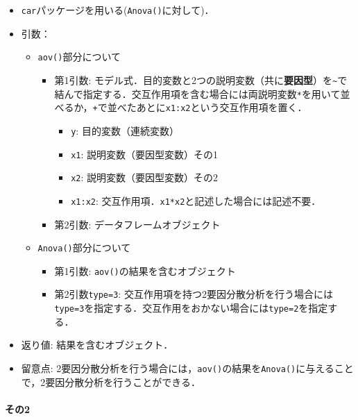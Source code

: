 \documentclass[
  xelatex, ja=standard]{bxjsarticle}
\providecommand{\tightlist}{%
  \setlength{\itemsep}{0pt}\setlength{\parskip}{0pt}}
\begin{document}
\begin{itemize}
\tightlist
\item
  \texttt{car}パッケージを用いる(\texttt{Anova()}に対して)．
\item
  引数：

  \begin{itemize}
  \tightlist
  \item
    \texttt{aov()}部分について

    \begin{itemize}
    \tightlist
    \item
      第1引数:
      モデル式．目的変数と2つの説明変数（共に\textbf{要因型}）を\texttt{\textasciitilde{}}で結んで指定する．交互作用項を含む場合には両説明変数\texttt{*}を用いて並べるか，\texttt{+}で並べたあとに\texttt{x1:x2}という交互作用項を置く．

      \begin{itemize}
      \tightlist
      \item
        \texttt{y}: 目的変数（連続変数）
      \item
        \texttt{x1}: 説明変数（要因型変数）その1
      \item
        \texttt{x2}: 説明変数（要因型変数）その2
      \item
        \texttt{x1:x2}:
        交互作用項．\texttt{x1*x2}と記述した場合には記述不要．
      \end{itemize}
    \item
      第2引数: データフレームオブジェクト
    \end{itemize}
  \item
    \texttt{Anova()}部分について

    \begin{itemize}
    \tightlist
    \item
      第1引数: \texttt{aov()}の結果を含むオブジェクト
    \item
      第2引数\texttt{type=3}:
      交互作用項を持つ2要因分散分析を行う場合には\texttt{type=3}を指定する．交互作用をおかない場合には\texttt{type=2}を指定する．
    \end{itemize}
  \end{itemize}
\item
  返り値: 結果を含むオブジェクト．
\item
  留意点:
  2要因分散分析を行う場合には，\texttt{aov()}の結果を\texttt{Anova()}に与えることで，2要因分散分析を行うことができる．
\end{itemize}

\paragraph{その2}\label{ux305dux306e2-1}
\end{document}
